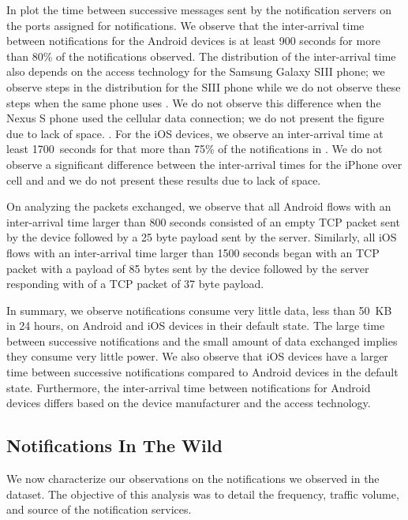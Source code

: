 In  plot the time between successive messages sent by the notification servers on the ports assigned for notifications. 
We observe that the inter-arrival time between notifications for the Android devices is at least 900 seconds for more than 80\% of the notifications observed. 
The distribution of the inter-arrival time also depends on the access technology for the Samsung Galaxy SIII phone; we observe steps in the distribution for the SIII phone while we do not observe these steps when the same phone uses \wifi. 
We do not observe this difference when the Nexus S phone used the cellular data connection; we do not present the figure due to lack of space. 
.
For the iOS devices, we observe an inter-arrival time at least 1700~seconds for that more than 75\% of the notifications in . 
We do not observe a significant difference between the inter-arrival times for the iPhone over cell and \wifi and we do not present these results due to lack of space. 

On analyzing the packets exchanged, we observe that  all Android flows with an inter-arrival time larger than 800 seconds consisted of an empty TCP packet sent by the device followed by a 25 byte payload sent by the server.
Similarly, all iOS flows with an inter-arrival time larger than 1500 seconds began with an TCP packet with a payload of 85 bytes sent by the device followed by the server responding with of a TCP packet of 37 byte payload.

In summary, we observe notifications consume very little data, less than 50~KB in 24 hours, on Android and iOS devices in their default state.
The large time between successive notifications and the small amount of data exchanged implies they consume very little power.
We also observe that iOS devices have a larger time between successive notifications compared to Android devices in the default state. 
Furthermore, the inter-arrival time between notifications for Android devices differs based on the device manufacturer and the access technology. 

\subsection{Notifications In The Wild} 

We now characterize our observations on the notifications we observed in the \mobWild dataset. 
The objective of this analysis was to detail the frequency, traffic volume, and source of the notification services. 

